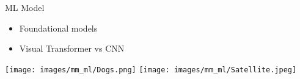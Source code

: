 \begin{frame}{ML Model}
     \begin{itemize}
        \item Foundational models
        \item Visual Transformer vs CNN
    \end{itemize}

    \texttt{[image: images/mm\_ml/Dogs.png]}
    \texttt{[image: images/mm\_ml/Satellite.jpeg]}
   
\end{frame}





